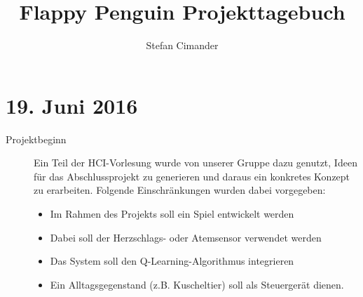 \documentclass{article}
\begin{document}
\title{Flappy Penguin Projekttagebuch}
\author{Stefan Cimander}
\date{}

\maketitle


\section*{19. Juni 2016}

\begin{description}
  \item[Projektbeginn] Ein Teil der HCI-Vorlesung wurde von unserer Gruppe dazu genutzt, Ideen für das Abschlussprojekt zu generieren und daraus ein konkretes Konzept zu erarbeiten. Folgende Einschränkungen wurden dabei vorgegeben:
  \begin{itemize}
  	\item Im Rahmen des Projekts soll ein Spiel entwickelt werden
  	\item Dabei soll der Herzschlags- oder Atemsensor verwendet werden
  	\item Das System soll den Q-Learning-Algorithmus integrieren
  	\item Ein Alltagsgegenstand (z.B. Kuscheltier) soll als Steuergerät dienen.
  \end{itemize} 
\end{description}
\end{document}

